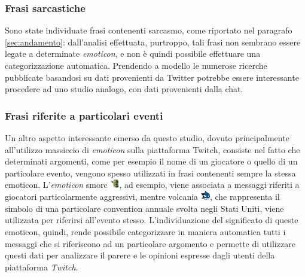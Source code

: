 \documentclass[a4paper,12pt,openright,twoside]{report}
\theoremstyle{definition}
\begin{document}
\subsubsection{Frasi sarcastiche}
Sono state individuate frasi contenenti sarcasmo, come riportato nel paragrafo \ref{sec:andamento}: 
dall'analisi effettuata, purtroppo, tali frasi non sembrano essere
legate a determinate \emph{emoticon}, e non è quindi possibile
effettuare una categorizzazione automatica.
Prendendo a modello le numerose ricerche pubblicate basandosi su dati provenienti da Twitter
\cite{Wang2015}
potrebbe essere interessante procedere ad uno studio analogo, con dati provenienti dalla chat.

\subsubsection{Frasi riferite a particolari eventi}
Un altro aspetto interessante emerso da questo studio, dovuto principalmente all'utilizzo massiccio di \emph{emoticon} sulla
piattaforma Twitch, 
consiste nel fatto che determinati argomenti, come per esempio il nome di un giocatore o 
quello di un particolare evento,
vengono spesso utilizzati in frasi contenenti sempre la stessa emoticon. 
L'\emph{emoticon} smorc \includegraphics[height=0.4cm, width=0.4cm]{Immagini/Emoticons/smorc.png}, ad esempio, 
viene associata a messaggi
riferiti a giocatori
particolarmente aggressivi, mentre volcania \includegraphics[height=0.4cm, width=0.4cm]{Immagini/Emoticons/volcania.png}, che rappresenta il simbolo di una particolare convention annuale svolta negli Stati Uniti,
viene utilizzata per riferirsi all'evento stesso.
L’individuazione del significato di queste emoticon, quindi, rende possibile categorizzare in maniera
automatica tutti i messaggi che si riferiscono ad un particolare argomento
e permette di utilizzare 
questi dati per analizzare il parere e le opinioni espresse dagli utenti della piattaforma \emph{Twitch}.
\end{document}
